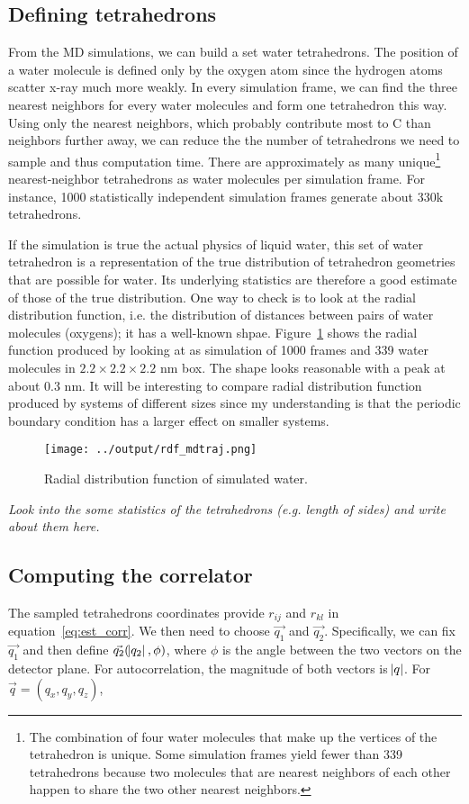 \documentclass[20pt]{article}
\begin{document}
\subsection{Defining tetrahedrons}
From the MD simulations, we can build a set water tetrahedrons. The position of a water molecule is defined only by the oxygen atom since the hydrogen atoms scatter x-ray much more weakly. In every simulation frame, we can find the three nearest neighbors for every water molecules and form one tetrahedron this way. Using only the nearest neighbors, which probably contribute most to C than neighbors further away, we can reduce the the number of tetrahedrons we need to sample and thus computation time. There are approximately as many unique\footnote{The combination of four water molecules that make up the vertices of the tetrahedron is unique. Some simulation frames yield fewer than 339 tetrahedrons because two molecules that are nearest neighbors of each other happen to share the two other nearest neighbors.} nearest-neighbor tetrahedrons as water molecules per simulation frame. For instance, 1000 statistically independent simulation frames generate about 330k tetrahedrons. 

If the simulation is true the actual physics of liquid water, this set of water tetrahedron is a representation of the true distribution of tetrahedron geometries that are possible for water. Its underlying statistics are therefore a good estimate of those of the true distribution. One way  to check is to look at the radial distribution function, i.e. the distribution of distances between pairs of water molecules (oxygens); it has a well-known shpae. Figure~\ref{fig:rdf_mdtraj} shows the radial function produced by looking at as simulation of 1000 frames and 339 water molecules in $2.2\times2.2\times2.2$ nm box. The shape looks reasonable with a peak at about 0.3 nm. It will be interesting to compare radial distribution function produced by systems of different sizes since my understanding is that the periodic boundary condition has a larger effect on smaller systems.
\begin{figure}[!h]\label{fig:rdf_mdtraj}
  \centering
    \texttt{[image: ../output/rdf\_mdtraj.png]}
     \caption{Radial distribution function of simulated water.}
\end{figure}

{\it Look into the some statistics of the tetrahedrons (e.g. length of sides) and write about them here. }

\subsection{Computing the correlator}
The sampled tetrahedrons coordinates provide $r_{ij}$ and $r_{kl}$ in equation~\ref{eq:est_corr}. We then need to choose $\vec{q_1}$ and $\vec{q_2}$. Specifically, we can fix $\vec{q_1}$ and then define $\vec{q_2}(\abs{q_2},\phi)$, where $\phi$ is the angle between the two vectors on the detector plane. For autocorrelation, the magnitude of both vectors is $\abs{q}$. For $\vec{q} = (q_x,q_y,q_z)$,
\end{document}
